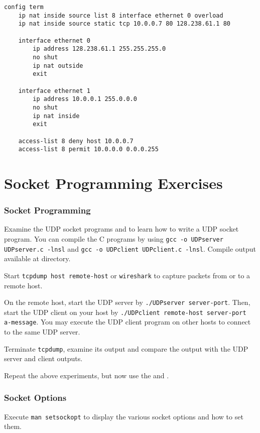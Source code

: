\documentclass{../UTNetLab}
\begin{document}
    \begin{lstlisting}[language={cisco}, caption={PAT Router Configuration in \hyperref[fig:8.7]{Figure~8.7} (Table~8.6)\label{tab:8.6}}]
config term
    ip nat inside source list 8 interface ethernet 0 overload
    ip nat inside source static tcp 10.0.0.7 80 128.238.61.1 80

    interface ethernet 0
        ip address 128.238.61.1 255.255.255.0
        no shut
        ip nat outside
        exit

    interface ethernet 1
        ip address 10.0.0.1 255.0.0.0
        no shut
        ip nat inside
        exit

    access-list 8 deny host 10.0.0.7
    access-list 8 permit 10.0.0.0 0.0.0.255
    \end{lstlisting}

\part{Socket Programming Exercises}
\section{Socket Programming}
    Examine the UDP socket programs  and  to learn how to write a UDP socket program.
    You can compile the C programs by using \lstinline{gcc -o UDPserver UDPserver.c -lnsl} and \lstinline{gcc -o UDPclient UDPclient.c -lnsl}.
    Compile output available at  directory.

    Start \lstinline[emph={your-host, remote-host}]{tcpdump host remote-host} or \lstinline{wireshark} to capture packets from or to a remote host.

    On the remote host, start the UDP server by \lstinline[emph={server-port}]{./UDPserver server-port}.
    Then, start the UDP client on your host by \lstinline[emph={your-host, remote-host, server-port, a-message}]{./UDPclient remote-host server-port a-message}.
    You may execute the UDP client program on other hosts to connect to the same UDP server.

    Terminate \lstinline{tcpdump}, examine its output and compare the output with the UDP server and client outputs.

    Repeat the above experiments, but now use the  and .

\section{Socket Options}
    Execute \lstinline{man setsockopt} to display the various socket options and how to set them.
\end{document}
